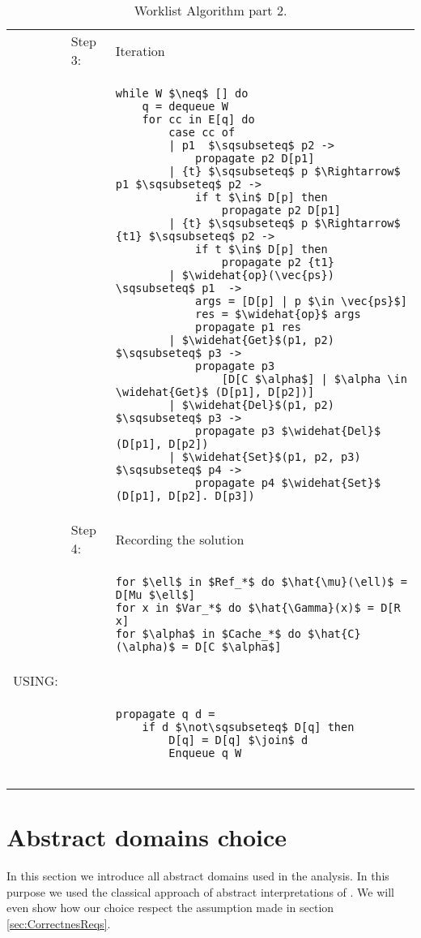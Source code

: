 \begin{table}[htb]
\small
\begin{center}
\begin{tabular}{l l l}
&Step 3: & Iteration\\
&&
\begin{lstlisting}[mathescape]
while W $\neq$ [] do
    q = dequeue W
    for cc in E[q] do
        case cc of
        | p1  $\sqsubseteq$ p2 -> 
            propagate p2 D[p1]
        | {t} $\sqsubseteq$ p $\Rightarrow$ p1 $\sqsubseteq$ p2 -> 
            if t $\in$ D[p] then
                propagate p2 D[p1]
        | {t} $\sqsubseteq$ p $\Rightarrow$ {t1} $\sqsubseteq$ p2 ->
            if t $\in$ D[p] then
                propagate p2 {t1}
        | $\widehat{op}(\vec{ps}) \sqsubseteq$ p1  -> 
            args = [D[p] | p $\in \vec{ps}$]
            res = $\widehat{op}$ args
            propagate p1 res
        | $\widehat{Get}$(p1, p2) $\sqsubseteq$ p3 -> 
            propagate p3 
                [D[C $\alpha$] | $\alpha \in \widehat{Get}$ (D[p1], D[p2])]
        | $\widehat{Del}$(p1, p2) $\sqsubseteq$ p3 -> 
            propagate p3 $\widehat{Del}$ (D[p1], D[p2]) 
        | $\widehat{Set}$(p1, p2, p3) $\sqsubseteq$ p4 -> 
            propagate p4 $\widehat{Set}$ (D[p1], D[p2]. D[p3]) 
\end{lstlisting}\\
& Step 4: & Recording the solution\\
&&
\begin{lstlisting}[mathescape]
for $\ell$ in $Ref_*$ do $\hat{\mu}(\ell)$ = D[Mu $\ell$]
for x in $Var_*$ do $\hat{\Gamma}(x)$ = D[R x]
for $\alpha$ in $Cache_*$ do $\hat{C}(\alpha)$ = D[C $\alpha$]
\end{lstlisting}\\
USING: \\
&&
\begin{lstlisting}[mathescape]
propagate q d =
    if d $\not\sqsubseteq$ D[q] then
        D[q] = D[q] $\join$ d
        Enqueue q W
    
\end{lstlisting}\\
\end{tabular}
\end{center}
\caption{Worklist Algorithm part 2.}
\label{tab:Worklist2}
\end{table}

\section{Abstract domains choice}
\label{sec:AbstractDomChoice}
In this section we introduce all abstract domains used in the analysis. In this purpose we used the classical approach of abstract interpretations of \cite{StringAbstraction, PrincipleProgramAnalysis}. We will even show how our choice respect the assumption made in section \ref{sec:CorrectnesReqs}.

